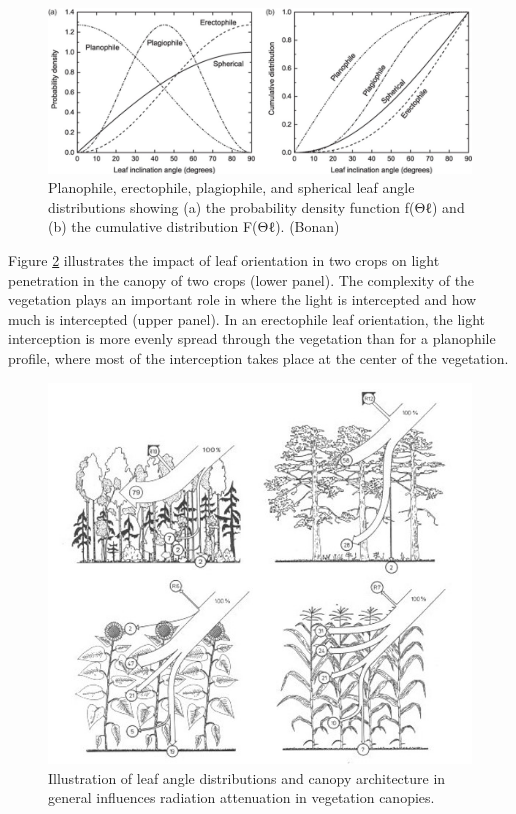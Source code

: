 \documentclass[12pt,oneside]{book}
\begin{document}
\begin{figure}

{\centering \includegraphics[width=0.8\linewidth]{figures/chap3/f34_angle_distr} 

}

\caption{Planophile, erectophile, plagiophile, and spherical leaf angle distributions showing (a) the probability density function f(Θℓ) and (b) the cumulative distribution F(Θℓ). (Bonan)}\label{fig:f34}
\end{figure}

Figure \ref{fig:f35} illustrates the impact of leaf orientation in two
crops on light penetration in the canopy of two crops (lower panel). The
complexity of the vegetation plays an important role in where the light
is intercepted and how much is intercepted (upper panel). In an
erectophile leaf orientation, the light interception is more evenly
spread through the vegetation than for a planophile profile, where most
of the interception takes place at the center of the vegetation.

\begin{figure}

{\centering \includegraphics[width=0.8\linewidth]{figures/chap3/f35_architecture} 

}

\caption{Illustration of leaf angle distributions and canopy architecture in general influences radiation attenuation in vegetation canopies.}\label{fig:f35}
\end{figure}
\end{document}
